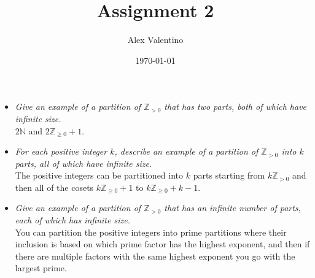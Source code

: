 \documentclass[12pt, letterpaper]{article}
\date{\today}
\author{Alex Valentino}
\title{Assignment 2}
\newcommand{\Z}{\mathbb{Z}}
\newcommand{\N}{\mathbb{N}}
\begin{document}
	\begin{itemize}
		\item \textit{Give an example of a partition of $\Z_{>0}$ that has two parts, both of which have infinite
size.}\\
	$2\N$ and $2\Z_{\geq 0} + 1$.
		\item \textit{For each positive integer $k$, describe an example of a partition of $\Z_{>0}$ into $k$ parts, all
of which have infinite size.}\\
		The positive integers can be partitioned into $k$ parts starting from $k\Z_{>0}$ and then all of the cosets $k\Z_{\geq0} + 1$ to $k\Z_{\geq0} + k - 1$.   
		\item \textit{Give an example of a partition of $\Z_{>0}$ that has an infinite number of parts, each of
which has infinite size.}\\
You can partition the positive integers into prime partitions where their inclusion is based on which prime factor has the highest exponent, and then if there are multiple factors with the same highest exponent you go with the largest prime.

	\end{itemize}
\end{document}
